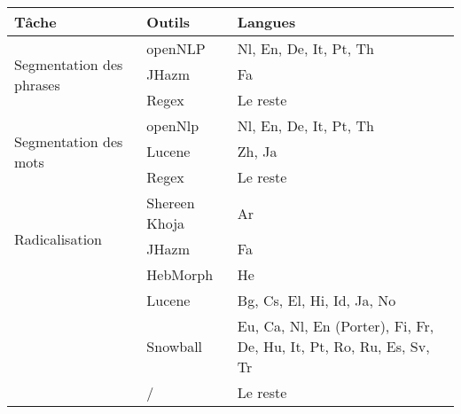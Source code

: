 \begin{tabular}{p{2cm}p{2cm}p{6cm}} 
\hline \hline
Tâche & Outils & Langues \\
\hline
\multirow{3}{2cm}{Segmentation des phrases} & openNLP & Nl, En, De, It, Pt, Th \\
\cline{2-3}
& JHazm & Fa \\
\cline{2-3}
& Regex & Le reste \\
\hline
\multirow{3}{2cm}{Segmentation des mots} & openNlp & Nl, En, De, It, Pt, Th \\
\cline{2-3}
& Lucene & Zh, Ja \\
\cline{2-3}
& Regex & Le reste \\
\hline
\multirow{3}{2cm}{Radicalisation} & Shereen Khoja & Ar \\
\cline{2-3}
& JHazm & Fa \\
\cline{2-3}
& HebMorph & He \\
\cline{2-3}
& Lucene & Bg, Cs, El, Hi, Id, Ja, No \\
\cline{2-3}
& Snowball & Eu, Ca, Nl, En (Porter), Fi, Fr, De, Hu, It, Pt, Ro, Ru, Es, Sv, Tr \\
\cline{2-3}
& / & Le reste \\
\hline \hline
\end{tabular}
